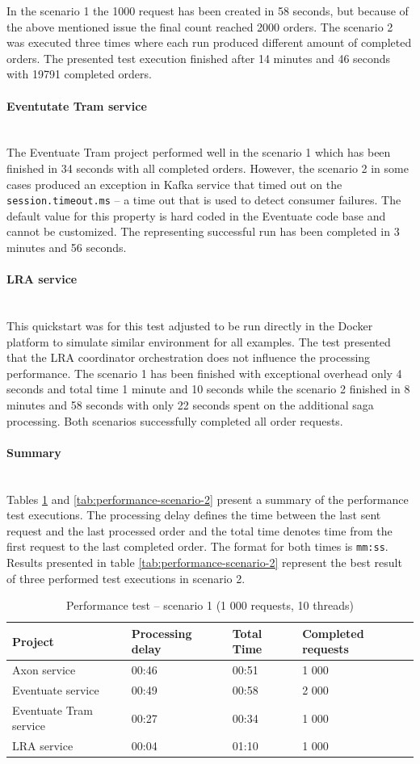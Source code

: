 \documentclass[oneside,
  digital, %
  table,   %
  lof,     %
  lot,     %
]{fithesis3}
\newcommand{\newlinepar}[1]{\paragraph{#1}\needspace{4\baselineskip}\mbox{}\\}
\begin{document}
In the scenario 1 the 1000 request has been created in 58 seconds, but because of the above mentioned issue the final count reached 2000 orders. The scenario 2 was executed three times where each run produced different amount of completed orders. The presented test execution finished after 14 minutes and 46 seconds with 19791 completed orders.

\newlinepar{Eventutate Tram service}

The Eventuate Tram project performed well in the scenario 1 which has been finished in 34 seconds with all completed orders. However, the scenario 2 in some cases produced an exception in Kafka service that timed out on the \texttt{session.timeout.ms} -- a time out that is used to detect consumer failures. The default value for this property is hard coded in the Eventuate code base and cannot be customized. The representing successful run has been completed in 3 minutes and 56 seconds.

\newlinepar{LRA service}

This quickstart was for this test adjusted to be run directly in the Docker platform to simulate similar environment for all examples. The test presented that the LRA coordinator orchestration does not influence the processing performance. The scenario 1 has been finished with  exceptional overhead only 4 seconds and total time 1 minute and 10 seconds while the scenario 2 finished in 8 minutes and 58 seconds with only 22 seconds spent on the additional saga processing. Both scenarios successfully completed all order requests.

\newlinepar{Summary}

Tables \ref{tab:performance-scenario-1} and \ref{tab:performance-scenario-2} present a summary of the performance test executions. The processing delay defines the time between the last sent request and the last processed order and the total time denotes time from the first request to the last completed order. The format for both times is \texttt{mm:ss}. Results presented in table \ref{tab:performance-scenario-2} represent the best result of three performed test executions in scenario 2.

\begin{table}[h]
    \begin{tabularx}{\textwidth}{lXXX}
        \toprule
        Project & Processing delay & Total Time & Completed requests \\
        \midrule
        Axon service & 00:46 & 00:51 & 1 000 \\
        Eventuate service & 00:49 & 00:58 & 2 000 \\
        Eventuate Tram service & 00:27 & 00:34 & 1 000 \\
        LRA service & 00:04 & 01:10 & 1 000 \\
        \bottomrule
    \end{tabularx}
    \caption{Performance test -- scenario 1 (1 000 requests, 10 threads)}
    \label{tab:performance-scenario-1}
\end{table}
\end{document}
